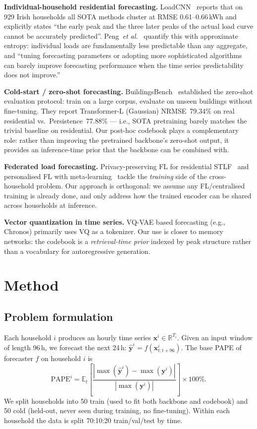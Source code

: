 \documentclass[conference]{IEEEtran}
\begin{document}
\textbf{Individual-household residential forecasting.}
LoadCNN~\cite{huang2019loadcnn} reports that on 929 Irish households all
SOTA methods cluster at RMSE 0.61--0.66\,kWh and explicitly states ``the
early peak and the three later peaks of the actual load curve cannot be
accurately predicted''. Peng~\textit{et al.}~\cite{peng2019aggregation}
quantify this with approximate entropy: individual loads are fundamentally
less predictable than any aggregate, and ``tuning forecasting parameters or
adopting more sophisticated algorithms can barely improve forecasting
performance when the time series predictability does not improve.''

\textbf{Cold-start / zero-shot forecasting.}
BuildingsBench~\cite{emami2023buildingsbench} established the zero-shot
evaluation protocol: train on a large corpus, evaluate on unseen buildings
without fine-tuning. They report Transformer-L (Gaussian) NRMSE~79.34\% on
real residential vs.\ Persistence~77.88\% --- i.e., SOTA pretraining barely
matches the trivial baseline on residential. Our post-hoc codebook plays a
complementary role: rather than improving the pretrained backbone's
zero-shot output, it provides an inference-time prior that the backbone can
be combined with.

\textbf{Federated load forecasting.} Privacy-preserving FL for residential
STLF~\cite{fernandez2021privacyfl} and personalised FL with
meta-learning~\cite{rahman2025pfl} tackle the \emph{training} side of the
cross-household problem. Our approach is orthogonal: we assume any
FL/centralised training is already done, and only address how the trained
encoder can be shared across households at inference.

\textbf{Vector quantization in time series.} VQ-VAE based forecasting (e.g.,
Chronos) primarily uses VQ as a tokenizer. Our use is closer to memory
networks: the codebook is a \emph{retrieval-time prior} indexed by peak
structure rather than a vocabulary for autoregressive generation.

\section{Method}\label{sec:method}

\subsection{Problem formulation}\label{sec:problem}

Each household $i$ produces an hourly time series
$\mathbf{x}^i \in \mathbb{R}^{T_i}$. Given an input window of length 96\,h,
we forecast the next 24\,h:
$\hat{\mathbf{y}}^i = f(\mathbf{x}^i_{t:t+96})$. The base PAPE of forecaster
$f$ on household $i$ is
\[
\text{PAPE}^i = \mathbb{E}_t\!\left[
\frac{|\max(\hat{\mathbf{y}}^i)-\max(\mathbf{y}^i)|}{|\max(\mathbf{y}^i)|}
\right]\!\times 100\%.
\]
We split households into 50 train (used to fit both backbone and codebook)
and 50 cold (held-out, never seen during training, no fine-tuning). Within
each household the data is split 70:10:20 train/val/test by time.
\end{document}
